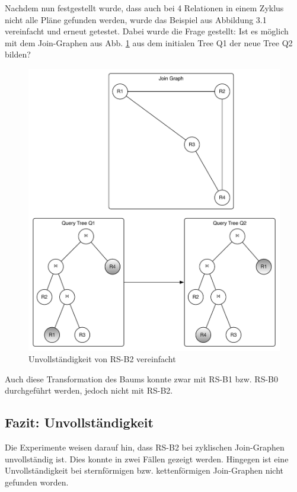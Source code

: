 Nachdem nun festgestellt wurde, dass auch bei 4 Relationen in einem Zyklus nicht alle Pläne gefunden werden, wurde das Beispiel aus Abbildung 3.1 vereinfacht und erneut getestet. Dabei wurde die Frage gestellt: Ist es möglich mit dem Join-Graphen aus Abb. \ref{CylceJoin3} aus dem initialen Tree Q1 der neue Tree Q2 bilden?

\begin{figure}[ht]
  \centering
  \includegraphics[scale=0.5]{05_ResultsEvaluation/00_media/CycleJoin3.pdf}
  \caption{Unvollständigkeit von RS-B2 vereinfacht}
  \label{CylceJoin3}
\end{figure}

Auch diese Transformation des Baums konnte zwar mit RS-B1 bzw. RS-B0 durchgeführt werden, jedoch nicht mit RS-B2.

\subsection{Fazit: Unvollständigkeit}
Die Experimente weisen darauf hin, dass RS-B2 bei zyklischen Join-Graphen unvollständig ist. Dies konnte in zwei Fällen gezeigt werden. Hingegen ist eine Unvollständigkeit bei sternförmigen bzw. kettenförmigen Join-Graphen nicht gefunden worden.